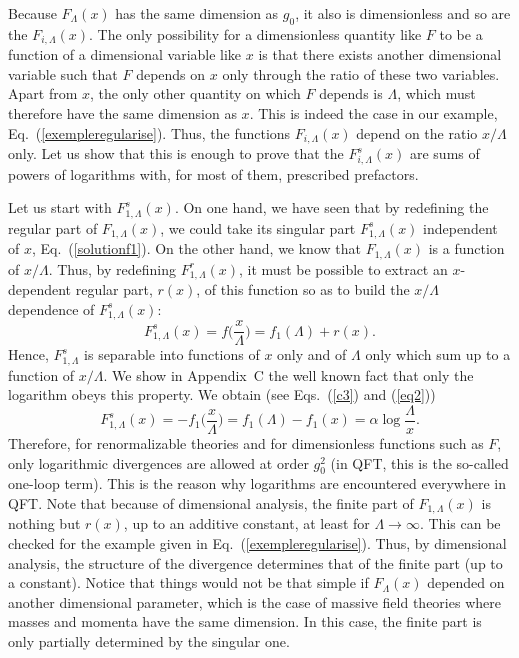 \documentclass[floatfix,preprintnumbers,amsmath,amssymb,prb,12pt]{revtex4-1}
\begin{document}
Because $F_\Lambda(x)$ has the same dimension as $g_0$, it
also is dimensionless and so are the
$F_{i,\Lambda}(x)$. The only possibility for a dimensionless
quantity like $F$ to be a function of a dimensional variable like
$x$ is that there exists another dimensional variable such that
$F$ depends on $x$ only through the ratio of these two variables.
Apart from $x$, the only other quantity on which $F$ depends is
$\Lambda$, which must therefore have the same dimension as $x$.
This is indeed the case in our example,
Eq.~(\ref{exempleregularise}). Thus, the functions
$F_{i,\Lambda}(x)$ depend on the ratio $x/\Lambda$
only.\cite{foot8} Let us show that this is enough to
prove that the $F_{i,\Lambda}^s(x)$ are sums of powers of
logarithms with, for most of them, prescribed prefactors.

Let us start with $F_{1,\Lambda}^s(x)$. On one hand, we have seen
that by redefining the regular part of $F_{1,\Lambda}(x)$, we
could take its singular part $F_{1,\Lambda}^s(x)$ independent of
$x$, Eq.~(\ref{solutionf1}). On the other hand, we know that 
$F_{1,\Lambda}(x)$ is a function of $x/\Lambda$. Thus, by
redefining $F_{1,\Lambda}^r(x)$, it must be possible to extract an
$x$-dependent regular part, $r(x)$, of this function so as to build the 
$x/\Lambda$ dependence of $F_{1,\Lambda}^s(x)$:
\begin{equation}
F_{1,\Lambda}^s(x)=f\big(\frac{x}{\Lambda}\big)=f_1(\Lambda) +
r(x).
\label{eq29}
\end{equation}
Hence, $F_{1,\Lambda}^s$ is separable into functions of $x$ only and of $\Lambda$ only
which sum up to a function of $x/\Lambda$. We show in Appendix~C
the well known fact that only the logarithm obeys this property.
We obtain (see Eqs.~(\ref{c3}) and (\ref{eq2}))
\begin{equation}
F_{1,\Lambda}^s(x)=-f_1\big(\frac{x}{\Lambda}\big)=f_1(\Lambda)-f_1(x)=
\alpha
\log\frac{\Lambda}{x}.
\label{eq30}
\end{equation}
Therefore, for renormalizable theories and for dimensionless
functions such as $F$, only logarithmic divergences are allowed at
order
$g_0^2$ (in QFT, this is the so-called one-loop term). This is the
reason why logarithms are encountered everywhere in QFT. Note
that because of dimensional analysis, the finite part of
$F_{1,\Lambda}(x)$ is nothing but
$r(x)$, up to an additive constant, at least for
$\Lambda\to\infty$. This can be checked for the example given in
Eq.~(\ref{exempleregularise}). Thus, by dimensional analysis, the
structure of the divergence determines that of the finite part (up
to a constant). Notice that things would not be that simple if
$F_{\Lambda}(x)$ depended on another dimensional parameter, which
is the case of massive field theories where masses and momenta 
have the same dimension. In this case, the finite part is only
partially determined by the singular one.
\end{document}
